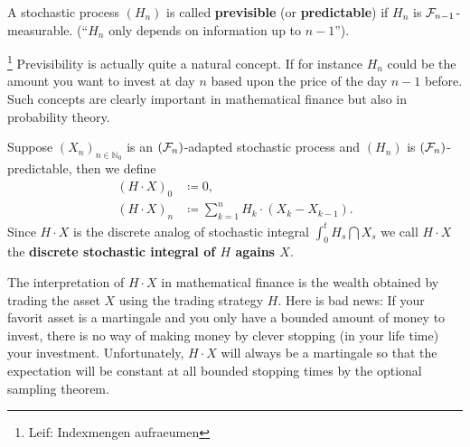 \begin{ldef}
\begin{deff}
	A stochastic process $(H_n)$ is called \textbf{previsible} (or \textbf{predictable}) if $H_n$ is $\mathcal{F}_{n-1}$-measurable. (\enquote{$H_n$ only depends on information up to $n-1$}). 
	\end{deff}
\end{ldef}
\footnote{Leif: Indexmengen aufraeumen}
Previsibility is actually quite a natural concept. If for instance $H_n$ could be the amount you want to invest at day $n$ based upon the price of the day $n-1$ before. Such concepts are clearly important in mathematical finance but also in probability theory.
\begin{ldef}
\begin{deff}
 Suppose $(X_n)_{n\in\mathbb{N}_0}$ is an $(\mathcal{F}_n)$-adapted stochastic process and $(H_n)$ is $(\mathcal{F}_n)$-predictable, then we define 
	\begin{align*}
		(H\cdot X)_0 &\coloneqq 0,\\
		(H\cdot X )_n &\coloneqq \sum\limits_{k=1}^{n}H_k \cdot (X_k - X_{k-1}).
	\end{align*}
	Since $H \cdot X$ is the discrete analog of stochastic integral $\int_{0}^{t}H_s \dint X_s$ we call $H\cdot X$ the \textbf{discrete stochastic integral of $H$ agains $X$}.
\end{deff}
\end{ldef}
The interpretation of $H\cdot X$ in mathematical finance is the wealth obtained by trading the asset $X$ using the trading strategy $H$. Here is bad news: If your favorit asset is a martingale and you only have a bounded amount of money to invest, there is no way of making money by clever stopping (in your life time) your investment. Unfortunately, $H\cdot X$ will always be a martingale so that the expectation will be constant at all bounded stopping times by the optional sampling theorem.
	\marginpar{\textcolor{red}{Lecture 6}}

